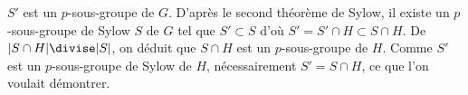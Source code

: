 $S'$ est un $p$-sous-groupe de $G$. D'après le second théorème de Sylow,
il existe un $p$-sous-groupe de Sylow $S$ de $G$ tel que $S'\subset S$ d'o\`u
$S'=S'\cap H\subset S\cap H$. De $|S\cap H|\divise |S|$, on déduit que $S\cap
H$ est un $p$-sous-groupe de $H$. Comme $S'$ est un $p$-sous-groupe de Sylow de
$H$, nécessairement $S'=S\cap H$, ce que l'on voulait démontrer.


